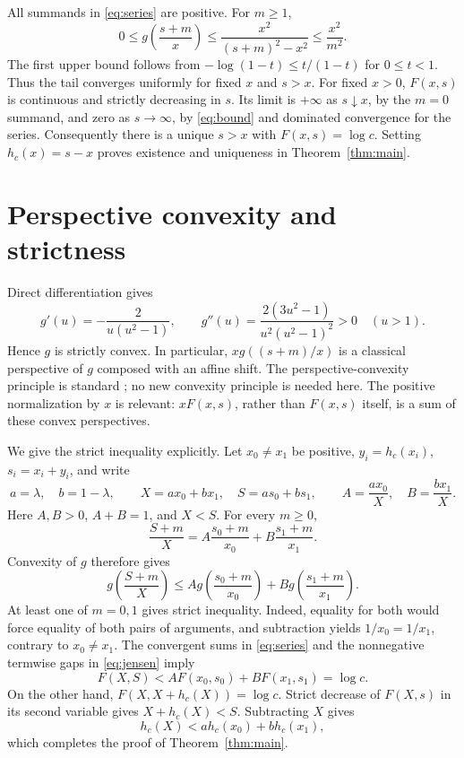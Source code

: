 \documentclass[11pt]{article}
\begin{document}
All summands in \eqref{eq:series} are positive. For $m\geq1$,
\begin{equation}\label{eq:bound}
 0\leq g\!\left(\frac{s+m}{x}\right)
 \leq \frac{x^2}{(s+m)^2-x^2}\leq\frac{x^2}{m^2}.
\end{equation}
The first upper bound follows from $-\log(1-t)\leq t/(1-t)$ for
$0\leq t<1$. Thus the tail converges uniformly for fixed $x$ and $s>x$.
For fixed $x>0$, $F(x,s)$ is continuous and strictly decreasing in $s$.
Its limit is $+\infty$ as $s\downarrow x$, by the $m=0$ summand, and
zero as $s\to\infty$, by \eqref{eq:bound} and dominated convergence for
the series. Consequently there is a unique $s>x$ with $F(x,s)=\log c$.
Setting $h_c(x)=s-x$ proves existence and uniqueness in
Theorem~\ref{thm:main}.

\section{Perspective convexity and strictness}
Direct differentiation gives
\[
 g'(u)=-\frac{2}{u(u^2-1)},\qquad
 g''(u)=\frac{2(3u^2-1)}{u^2(u^2-1)^2}>0\quad(u>1).
\]
Hence $g$ is strictly convex. In particular,
$xg((s+m)/x)$ is a classical perspective of $g$ composed with an affine
shift. The perspective-convexity principle is standard
\cite[Propositions~2.3 and~2.13]{Combettes}; no new convexity principle is
needed here. The positive normalization by $x$ is relevant: $xF(x,s)$,
rather than $F(x,s)$ itself, is a sum of these convex perspectives.

We give the strict inequality explicitly. Let $x_0\ne x_1$ be positive,
$y_i=h_c(x_i)$, $s_i=x_i+y_i$, and write
\[
 a=\lambda,\quad b=1-\lambda,\qquad
 X=ax_0+bx_1,\quad S=as_0+bs_1,\qquad
 A=\frac{ax_0}{X},\quad B=\frac{bx_1}{X}.
\]
Here $A,B>0$, $A+B=1$, and $X<S$. For every $m\geq0$,
\begin{equation}\label{eq:weights}
 \frac{S+m}{X}
 =A\frac{s_0+m}{x_0}+B\frac{s_1+m}{x_1}.
\end{equation}
Convexity of $g$ therefore gives
\begin{equation}\label{eq:jensen}
 g\!\left(\frac{S+m}{X}\right)
 \leq A g\!\left(\frac{s_0+m}{x_0}\right)
      +B g\!\left(\frac{s_1+m}{x_1}\right).
\end{equation}
At least one of $m=0,1$ gives strict inequality. Indeed, equality for both
would force equality of both pairs of arguments, and subtraction yields
$1/x_0=1/x_1$, contrary to $x_0\ne x_1$.
The convergent sums in \eqref{eq:series} and the nonnegative termwise
gaps in \eqref{eq:jensen} imply
\[
 F(X,S)<A F(x_0,s_0)+B F(x_1,s_1)=\log c.
\]
On the other hand, $F(X,X+h_c(X))=\log c$. Strict decrease of $F(X,s)$
in its second variable gives $X+h_c(X)<S$. Subtracting $X$ gives
\[
 h_c(X)<a h_c(x_0)+b h_c(x_1),
\]
which completes the proof of Theorem~\ref{thm:main}.
\end{document}
